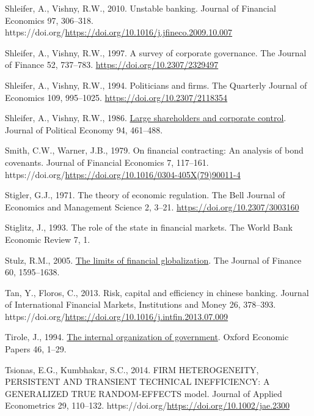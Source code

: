 \documentclass[
  letterpaper,
  DIV=11,
  numbers=noendperiod]{scrreprt}
\newlength{\cslhangindent}
\newenvironment{CSLReferences}[2] %
 {\begin{list}{}{%
  \setlength{\itemindent}{0pt}
  \setlength{\leftmargin}{0pt}
  \setlength{\parsep}{0pt}
  \ifodd #1
   \setlength{\leftmargin}{\cslhangindent}
   \setlength{\itemindent}{-1\cslhangindent}
  \fi
  \setlength{\itemsep}{#2\baselineskip}}}
 {\end{list}}
\begin{document}
\begin{CSLReferences}{1}{0}
Shleifer, A., Vishny, R.W., 2010. Unstable banking. Journal of Financial
Economics 97, 306--318.
https://doi.org/\url{https://doi.org/10.1016/j.jfineco.2009.10.007}

Shleifer, A., Vishny, R.W., 1997. A survey of corporate governance. The
Journal of Finance 52, 737--783. \url{https://doi.org/10.2307/2329497}

Shleifer, A., Vishny, R.W., 1994. Politicians and firms. The Quarterly
Journal of Economics 109, 995--1025.
\url{https://doi.org/10.2307/2118354}

Shleifer, A., Vishny, R.W., 1986.
\href{http://www.jstor.org.queens.ezp1.qub.ac.uk/stable/1833044}{Large
shareholders and corporate control}. Journal of Political Economy 94,
461--488.

Smith, C.W., Warner, J.B., 1979. On financial contracting: An analysis
of bond covenants. Journal of Financial Economics 7, 117--161.
https://doi.org/\url{https://doi.org/10.1016/0304-405X(79)90011-4}

Stigler, G.J., 1971. The theory of economic regulation. The Bell Journal
of Economics and Management Science 2, 3--21.
\url{https://doi.org/10.2307/3003160}

Stiglitz, J., 1993. The role of the state in financial markets. The
World Bank Economic Review 7, 1.

Stulz, R.M., 2005.
\href{http://www.jstor.org.queens.ezp1.qub.ac.uk/stable/3694849}{The
limits of financial globalization}. The Journal of Finance 60,
1595--1638.

Tan, Y., Floros, C., 2013. Risk, capital and efficiency in chinese
banking. Journal of International Financial Markets, Institutions and
Money 26, 378--393.
https://doi.org/\url{https://doi.org/10.1016/j.intfin.2013.07.009}

Tirole, J., 1994. \href{http://www.jstor.org/stable/2663521}{The
internal organization of government}. Oxford Economic Papers 46, 1--29.

Tsionas, E.G., Kumbhakar, S.C., 2014. FIRM HETEROGENEITY, PERSISTENT AND
TRANSIENT TECHNICAL INEFFICIENCY: A GENERALIZED TRUE RANDOM-EFFECTS
model. Journal of Applied Econometrics 29, 110--132.
https://doi.org/\url{https://doi.org/10.1002/jae.2300}


\end{CSLReferences}
\end{document}
